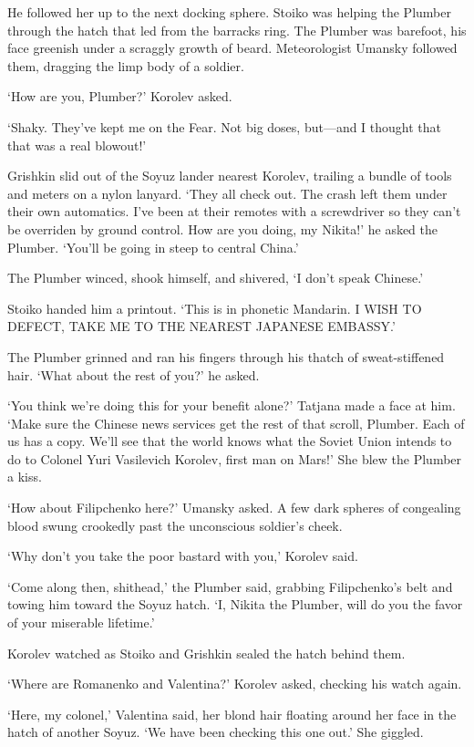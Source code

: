 He followed her up to the next docking sphere. Stoiko was helping the Plumber through the hatch that led from the barracks ring. The Plumber was barefoot, his face greenish under a scraggly growth of beard. Meteorologist Umansky followed them, dragging the limp body of a soldier.

‘How are you, Plumber?’ Korolev asked.

‘Shaky. They’ve kept me on the Fear. Not big doses, but—and I thought that that was a real blowout!’

Grishkin slid out of the Soyuz lander nearest Korolev, trailing a bundle of tools and meters on a nylon lanyard. ‘They all check out. The crash left them under their own automatics. I’ve been at their remotes with a screwdriver so they can’t be overriden by ground control. How are you doing, my Nikita!’ he asked the Plumber. ‘You’ll be going in steep to central China.’

The Plumber winced, shook himself, and shivered, ‘I don’t speak Chinese.’

Stoiko handed him a printout. ‘This is in phonetic Mandarin. I WISH TO DEFECT, TAKE ME TO THE NEAREST JAPANESE EMBASSY.’

The Plumber grinned and ran his fingers through his thatch of sweat-stiffened hair. ‘What about the rest of you?’ he asked.

‘You think we’re doing this for your benefit alone?’ Tatjana made a face at him. ‘Make sure the Chinese news services get the rest of that scroll, Plumber. Each of us has a copy. We’ll see that the world knows what the Soviet Union intends to do to Colonel Yuri Vasilevich Korolev, first man on Mars!’ She blew the Plumber a kiss.

‘How about Filipchenko here?’ Umansky asked. A few dark spheres of congealing blood swung crookedly past the unconscious soldier’s cheek.

‘Why don’t you take the poor bastard with you,’ Korolev said.

‘Come along then, shithead,’ the Plumber said, grabbing Filipchenko’s belt and towing him toward the Soyuz hatch. ‘I, Nikita the Plumber, will do you the favor of your miserable lifetime.’

Korolev watched as Stoiko and Grishkin sealed the hatch behind them.

‘Where are Romanenko and Valentina?’ Korolev asked, checking his watch again.

‘Here, my colonel,’ Valentina said, her blond hair floating around her face in the hatch of another Soyuz. ‘We have been checking this one out.’ She giggled.

